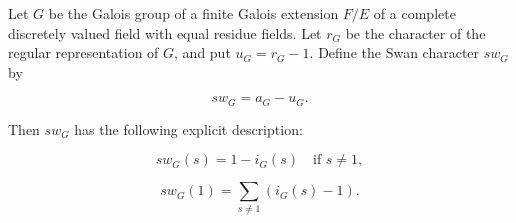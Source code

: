 Let $G$ be the Galois group of a finite Galois extension $F/E$ of a complete discretely valued field with equal residue fields. Let $r_G$ be the character of the regular representation of $G$, and put $u_G = r_G - 1$. Define the Swan character $sw_G$ by

$$sw_G = a_G - u_G.$$

Then $sw_G$ has the following explicit description:

$$sw_G(s) = 1 - i_G(s) \quad \text{if } s \neq 1,$$

$$sw_G(1) = \sum_{s \neq 1} (i_G(s) - 1).$$
